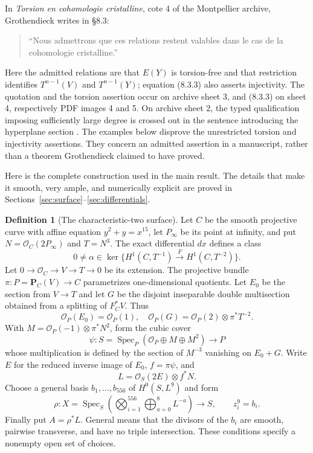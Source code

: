 \documentclass[11pt,a4paper]{article}
\newcommand{\OO}{\mathcal O}
\newcommand{\PP}{\mathbf P}
\newcommand{\Spec}{\operatorname{Spec}}
\theoremstyle{definition}\newtheorem{definition}[theorem]{Definition}
\theoremstyle{remark}\newtheorem{remark}[theorem]{Remark}
\numberwithin{equation}{section}
\begin{document}
In \emph{Torsion en cohomologie cristalline}, cote 4 of the Montpellier archive, Grothendieck writes in \S8.3:
\begin{quote}
``Nous admettrons que ces relations restent valables dans le cas de la cohomologie cristalline.''
\end{quote}
Here the admitted relations are that $E(Y)$ is torsion-free and that restriction identifies $T^{n-1}(V)$ and $T^{n-1}(Y)$; equation (8.3.3) also asserts injectivity. The quotation and the torsion assertion occur on archive sheet 3, and (8.3.3) on sheet 4, respectively PDF images 4 and 5. On archive sheet 2, the typed qualification imposing sufficiently large degree is crossed out in the sentence introducing the hyperplane section \citep[\S\S8.1, 8.3, archive sheets 2--4]{Grothendieck}. The examples below disprove the unrestricted torsion and injectivity assertions. They concern an admitted assertion in a manuscript, rather than a theorem Grothendieck claimed to have proved.

Here is the complete construction used in the main result. The details that make it smooth, very ample, and numerically explicit are proved in Sections~\ref{sec:surface}--\ref{sec:differentials}.

\begin{definition}[The characteristic-two surface]\label{def:explicit}
Let $C$ be the smooth projective curve with affine equation $y^2+y=x^{15}$, let $P_\infty$ be its point at infinity, and put $N=\OO_C(2P_\infty)$ and $T=N^3$. The exact differential $dx$ defines a class
\[
 0\ne\alpha\in\ker\{H^1(C,T^{-1})\xrightarrow{F}H^1(C,T^{-2})\}.
\]
Let $0\to\OO_C\to V\to T\to0$ be its extension. The projective bundle $\pi:P=\PP_C(V)\to C$ parametrizes one-dimensional quotients. Let $E_0$ be the section from $V\to T$ and let $G$ be the disjoint inseparable double multisection obtained from a splitting of $F_C^*V$. Thus
\[
 \OO_P(E_0)=\OO_P(1),\quad
 \OO_P(G)=\OO_P(2)\otimes\pi^*T^{-2}.
\]
With $M=\OO_P(-1)\otimes\pi^*N^2$, form the cubic cover
\[
 \psi:S=\Spec_P(\OO_P\oplus M\oplus M^2)\longrightarrow P
\]
whose multiplication is defined by the section of $M^{-3}$ vanishing on $E_0+G$. Write $E$ for the reduced inverse image of $E_0$, $f=\pi\psi$, and
\[
 L=\OO_S(2E)\otimes f^*N.
\]
Choose a general basis $b_1,\ldots,b_{556}$ of $H^0(S,L^9)$ and form
\[
 \rho:X=\Spec_S\left(\bigotimes_{i=1}^{556}
                  \bigoplus_{a=0}^{8}L^{-a}\right)\longrightarrow S,
 \qquad z_i^9=b_i.
\]
Finally put $A=\rho^*L$. General means that the divisors of the $b_i$ are smooth, pairwise transverse, and have no triple intersection. These conditions specify a nonempty open set of choices.
\end{definition}
\end{document}
